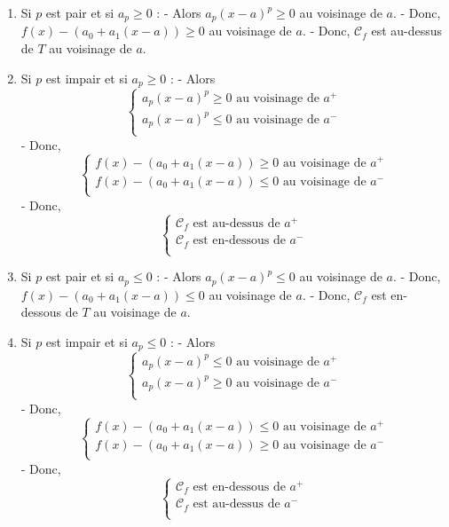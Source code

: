 \begin{Rem}

\begin{enumerate}
\item Si $p$ est pair et si $a_p \geq 0$ :
  - Alors $a_p(x - a)^p \geq 0$ au voisinage de $a$.
  - Donc, $f(x) - (a_0 + a_1(x - a)) \geq 0$ au voisinage de $a$.
  - Donc, $\mathcal{C}_f$ est au-dessus de $T$ au voisinage de $a$.

\item Si $p$ est impair et si $a_p \geq 0$ :
  - Alors
    \[
    \begin{cases}
      a_p(x - a)^p \geq 0 \text{ au voisinage de } a^+ \\
      a_p(x - a)^p \leq 0 \text{ au voisinage de } a^- \\
    \end{cases}
    \]
  - Donc,
    \[
    \begin{cases}
      f(x) - (a_0 + a_1(x - a)) \geq 0 \text{ au voisinage de } a^+ \\
      f(x) - (a_0 + a_1(x - a)) \leq 0 \text{ au voisinage de } a^- \\
    \end{cases}
    \]
  - Donc,
    \[
    \begin{cases}
      \mathcal{C}_f \text{ est au-dessus de } a^+ \\
      \mathcal{C}_f \text{ est en-dessous de } a^- \\
    \end{cases}
    \]

\item Si $p$ est pair et si $a_p \leq 0$ :
  - Alors $a_p(x - a)^p \leq 0$ au voisinage de $a$.
  - Donc, $f(x) - (a_0 + a_1(x - a)) \leq 0$ au voisinage de $a$.
  - Donc, $\mathcal{C}_f$ est en-dessous de $T$ au voisinage de $a$.

\item Si $p$ est impair et si $a_p \leq 0$ :
  - Alors
    \[
    \begin{cases}
      a_p(x - a)^p \leq 0 \text{ au voisinage de } a^+ \\
      a_p(x - a)^p \geq 0 \text{ au voisinage de } a^- \\
    \end{cases}
    \]
  - Donc,
    \[
    \begin{cases}
      f(x) - (a_0 + a_1(x - a)) \leq 0 \text{ au voisinage de } a^+ \\
      f(x) - (a_0 + a_1(x - a)) \geq 0 \text{ au voisinage de } a^- \\
    \end{cases}
    \]
  - Donc,
    \[
    \begin{cases}
      \mathcal{C}_f \text{ est en-dessous de } a^+ \\
      \mathcal{C}_f \text{ est au-dessus de } a^- \\
    \end{cases}
    \]
    
    \end{enumerate}
\end{Rem}


